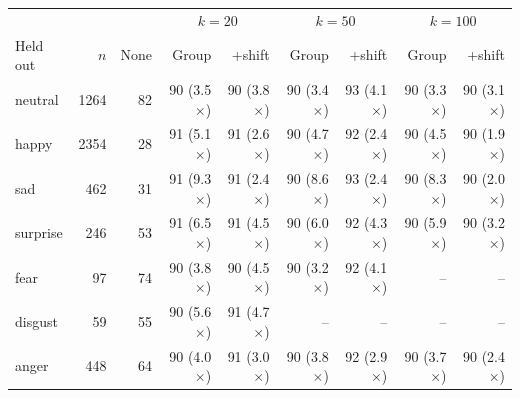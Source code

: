 \begin{tabular}{lrrrrrrrr}
\toprule
 & & & \multicolumn{2}{c}{$k=20$} & \multicolumn{2}{c}{$k=50$} & \multicolumn{2}{c}{$k=100$} \\
Held out & $n$ & None & Group & +shift & Group & +shift & Group & +shift \\
\midrule
neutral & 1264 & 82 & 90 (3.5$\times$) & 90 (3.8$\times$) & 90 (3.4$\times$) & 93 (4.1$\times$) & 90 (3.3$\times$) & 90 (3.1$\times$) \\
happy & 2354 & 28 & 91 (5.1$\times$) & 91 (2.6$\times$) & 90 (4.7$\times$) & 92 (2.4$\times$) & 90 (4.5$\times$) & 90 (1.9$\times$) \\
sad & 462 & 31 & 91 (9.3$\times$) & 91 (2.4$\times$) & 90 (8.6$\times$) & 93 (2.4$\times$) & 90 (8.3$\times$) & 90 (2.0$\times$) \\
surprise & 246 & 53 & 91 (6.5$\times$) & 91 (4.5$\times$) & 90 (6.0$\times$) & 92 (4.3$\times$) & 90 (5.9$\times$) & 90 (3.2$\times$) \\
fear & 97 & 74 & 90 (3.8$\times$) & 90 (4.5$\times$) & 90 (3.2$\times$) & 92 (4.1$\times$) & -- & -- \\
disgust & 59 & 55 & 90 (5.6$\times$) & 91 (4.7$\times$) & -- & -- & -- & -- \\
anger & 448 & 64 & 90 (4.0$\times$) & 91 (3.0$\times$) & 90 (3.8$\times$) & 92 (2.9$\times$) & 90 (3.7$\times$) & 90 (2.4$\times$) \\
\bottomrule
\end{tabular}
